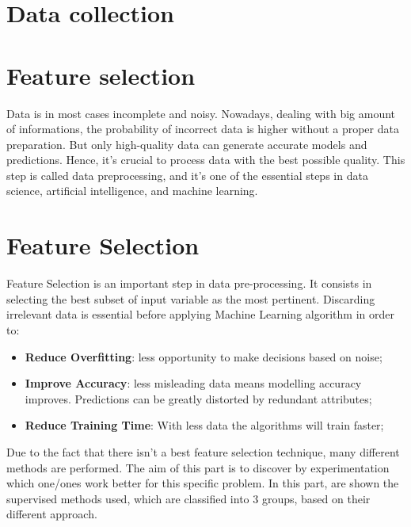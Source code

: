 \section{Data collection}
\section{Feature selection}
Data is in most cases incomplete and noisy.
Nowadays, dealing with big amount of informations, the probability of incorrect data is higher without a proper data preparation. 
But only high-quality data can generate accurate models and predictions. Hence, it’s crucial to process data with the best possible quality. This step is called data preprocessing, and it’s one of the essential steps in data science, artificial intelligence, and machine learning.
\section{Feature Selection}
Feature Selection is an important step in data pre-processing. It consists in selecting the best subset of input variable as the most pertinent. Discarding irrelevant data is essential before applying Machine Learning algorithm in order to:
\begin{itemize}
\item \textbf{Reduce Overfitting}: less opportunity to make decisions based on noise;
\item \textbf{Improve Accuracy}: less misleading data means modelling accuracy improves. Predictions can be greatly distorted by redundant attributes;
\item \textbf{Reduce Training Time}: With less data the algorithms will train faster;
\end{itemize}
Due to the fact that there isn’t a best feature selection technique, many different methods are performed. The aim of this part is to discover by experimentation which one/ones work better for this specific problem. 
In this part, are shown the supervised methods used, which are classified into 3 groups, based on their  different approach.
